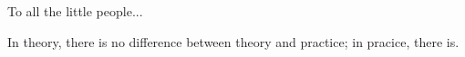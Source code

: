\begin{acknowledge}

To all the little people...

\end{acknowledge}

\begin{dedication}

In theory, there is no difference between theory and practice; in pracice, there is.

\end{dedication}